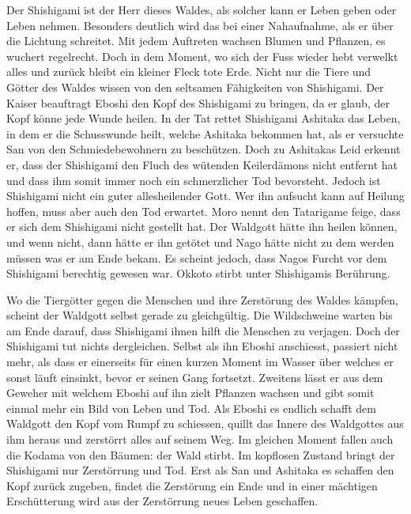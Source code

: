 Der Shishigami ist der Herr dieses Waldes, als solcher kann er Leben geben oder Leben nehmen. Besonders deutlich wird das bei einer Nahaufnahme, als er über die Lichtung schreitet. Mit jedem Auftreten wachsen Blumen und Pflanzen, es wuchert regelrecht. Doch in dem Moment, wo sich der Fuss wieder hebt verwelkt alles und zurück bleibt ein kleiner Fleck tote Erde. Nicht nur die Tiere und Götter des Waldes wissen von den seltsamen Fähigkeiten von Shishigami. Der Kaiser beauftragt Eboshi den Kopf des Shishigami zu bringen, da er glaub, der Kopf könne jede Wunde heilen. In der Tat rettet Shishigami Ashitaka das Leben, in dem er die Schusswunde heilt, welche Ashitaka bekommen hat, als er versuchte San von den Schmiedebewohnern zu beschützen. Doch zu Ashitakas Leid erkennt er, dass der Shishigami den Fluch des wütenden Keilerdämons nicht entfernt hat und dass ihm somit immer noch ein schmerzlicher Tod bevorsteht. Jedoch ist Shishigami nicht ein guter allesheilender Gott. Wer ihn aufsucht kann auf Heilung hoffen, muss aber auch den Tod erwartet. Moro nennt den Tatarigame feige, dass er sich dem Shishigami nicht gestellt hat. Der Waldgott hätte ihn heilen können, und wenn nicht, dann hätte er ihn getötet und Nago hätte nicht zu dem werden müssen was er am Ende bekam. Es scheint jedoch, dass Nagos Furcht vor dem Shishigami berechtig gewesen war. Okkoto stirbt unter Shishigamis Berührung.

Wo die Tiergötter gegen die Menschen und ihre Zerstörung des Waldes kämpfen, scheint der Waldgott selbst gerade zu gleichgültig. Die Wildschweine warten bis am Ende darauf, dass Shishigami ihnen hilft die Menschen zu verjagen. Doch der Shishigami tut nichts dergleichen. Selbst als ihn Eboshi anschiesst, passiert nicht mehr, als dass er einerseits für einen kurzen Moment im Wasser über welches er sonst läuft einsinkt, bevor er seinen Gang fortsetzt. Zweitens lässt er aus dem Geweher mit welchem Eboshi auf ihn zielt Pflanzen wachsen und gibt somit einmal mehr ein Bild von Leben und Tod. Als Eboshi es endlich schafft dem Waldgott den Kopf vom Rumpf zu schiessen, quillt das Innere des Waldgottes aus ihm heraus und zerstörrt alles auf seinem Weg. Im gleichen Moment fallen auch die Kodama von den Bäumen: der Wald stirbt. Im kopflosen Zustand bringt der Shishigami nur Zerstörrung und Tod. Erst als San und Ashitaka es schaffen den Kopf zurück zugeben, findet die Zerstörung ein Ende und in einer mächtigen Erschütterung wird aus der Zerstörrung neues Leben geschaffen. 